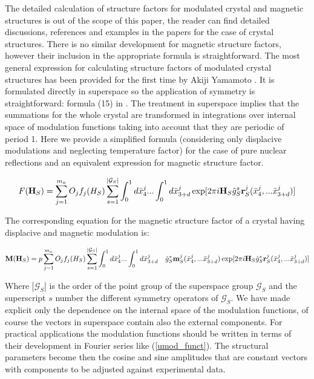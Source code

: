 \documentclass[10pt]{article}
\begin{document}
The detailed calculation of structure factors for modulated crystal and magnetic structures is out of the scope of this paper, the reader can find detailed discussions, references and examples in the papers \cite{Janssen-Janner, Yamamoto, Perez-Mato-StrFac} for the case of crystal structures. There is no similar development for magnetic structure factors, however their inclusion in the appropriate formula is straightforward. The most general expression for calculating structure factors of modulated crystal structures has been provided for the first time by Akiji Yamamoto \cite{Yamamoto}. It is formulated directly in superspace so the application of symmetry is straightforward: formula (15) in \cite{Yamamoto}. The treatment in superspace implies that the summations for the whole crystal are transformed in integrations over internal space of modulation functions taking into account that they are periodic of period 1. Here we provide a simplified formula (considering only displacive modulations and neglecting temperature factor) for the case of pure nuclear reflections and an equivalent expression for magnetic structure factor.  

\begin{eqnarray} \label{strfac_superspace}
F({\bf H}_S)= \sum\limits_{j=1}^{m_a} O_j f_j(H_S)  \sum\limits_{s=1}^{|\mathcal G_S|} \int_{0}^{1} d\bar x_4^j ... \int_{0}^{1} d\bar x_{3+d}^j \exp[2\pi i {\bf H}_S \hat g^s_S {\bf r}_S^{j}(\bar x_4^j, ...\bar x_{3+d}^j)]
\end{eqnarray}

The corresponding equation for the magnetic structure factor of a crystal having displacive and magnetic modulation is:

\begin{eqnarray} \label{magstrfac_superspace}
{\bf M}({\bf H}_S)= p \sum\limits_{j=1}^{m_a} O_j f_j(H_S)  \sum\limits_{s=1}^{|\mathcal G_S|} \int_{0}^{1} d\bar x_4^j ... \int_{0}^{1} d\bar x_{3+d}^j \quad \hat g^s_S{\bf m}_S^j(\bar x_4^j, ...\bar x_{3+d}^j) \exp[2\pi i {\bf H}_S \hat g^s_S {\bf r}_S^{j}(\bar x_4^j, ...\bar x_{3+d}^j)]
\end{eqnarray}

Where $|\mathcal G_S|$ is the order of the point group of the superspace group $\mathcal G_S$
and the superscript $s$ number the different symmetry operators of $\mathcal G_S$.
We have made explicit only the dependence on the internal space of the modulation functions, of course the vectors in superspace contain also the external components. For practical applications the modulation functions should be written in terms of their development in Fourier series like (\ref{umod_funct}). The structural parameters become then the cosine and sine amplitudes that are constant vectors with components to be adjusted against experimental data.
\end{document}

